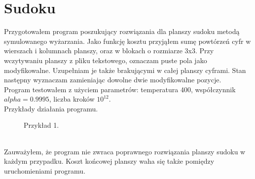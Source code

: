 \documentclass{article}
\begin{document}
    \clearpage
    \section{Sudoku}
        Przygotowałem program poszukujący rozwiązania dla planszy sudoku metodą symulowanego wyżarzania. Jako funkcję kosztu przyjąłem sumę powtórzeń cyfr w wierszach i kolumnach planszy, oraz w blokach o rozmiarze 3x3. Przy wczytywaniu planszy z pliku tekstowego, oznaczam puste pola jako modyfikowalne. Uzupełniam je także brakującymi w całej planszy cyframi. Stan następny wyznaczam zamieniając dowolne dwie modyfikowalne pozycje. \\
        Program testowałem z użyciem parametrów: temperatura 400, współczynnik $alpha = 0.9995$, liczba kroków $10^{12}$.\\
        Przykłady działania programu. 
        \begin{figure}[h!]
            \centering
            
            \caption{Przykład 1.}
        \end{figure}\\

        
        
        \FloatBarrier 
        Zauważyłem, że program nie zwraca poprawnego rozwiązania planszy sudoku w każdym przypadku. Koszt końcowej planszy waha się także pomiędzy uruchomieniami programu. 
\end{document}
